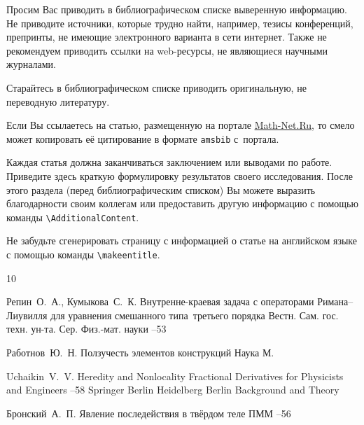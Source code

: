 Просим Вас приводить в библиографическом списке выверенную информацию.
Не приводите источники, которые трудно найти, например, тезисы конференций, препринты, не имеющие электронного варианта в сети интернет.
Также не рекомендуем приводить ссылки на web-ресурсы, не являющиеся научными журналами.

Старайтесь в библиографическом списке приводить оригинальную, не переводную литературу.

Если Вы ссылаетесь на статью, размещенную на портале \href{http://www.mathnet.ru/}{Math-Net.Ru}, то смело может копировать её цитирование в формате  {\tt amsbib} с~портала.


Каждая статья должна заканчиваться заключением или выводами по работе. 
Приведите здесь краткую формулировку результатов своего исследования. 
После этого раздела (перед библиографическим списком) Вы можете выразить благодарности своим коллегам или предоставить другую информацию с помощью команды \verb"\AdditionalContent".

Не забудьте сгенерировать страницу с информацией о статье на английском языке с помощью команды \verb"\makeentitle".



\begin{thebibliography}{10}

\by Репин~О.~А., Кумыкова~С.~К.
\paper Внутренне-краевая задача с операторами Римана--Лиувилля для уравнения смешанного типа~третьего порядка
\jour Вестн. Сам. гос. техн. ун-та. Сер. Физ.-мат. науки
--53


\by Работнов~Ю.~Н.
\book Ползучесть элементов конструкций
\publ Наука
\publaddr М.

\by Uchaikin~V.~V.
\paper Heredity and Nonlocality
\inbook Fractional Derivatives for Physicists and Engineers
--58
\publ Springer Berlin Heidelberg
\publaddr Berlin
\volinfo Background and Theory


\by Бронский~А.~П.
\paper Явление последействия в твёрдом теле
\jour ПММ
--56


\end{thebibliography}

\makeentitle


